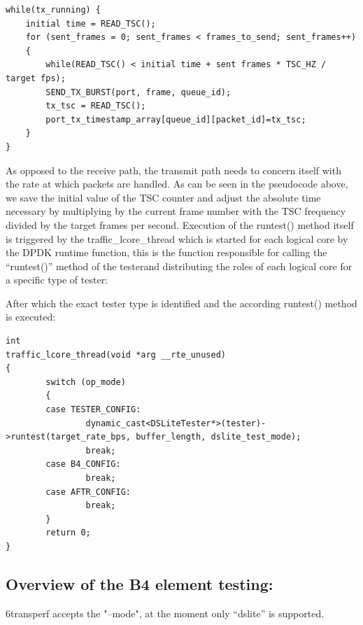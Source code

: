 \documentclass[a4paper,12p,titlepage]{article}
\begin{document}
\begin{frame}

\lstset{language=C++,breaklines=true,numbers=left}
\begin{lstlisting}
while(tx_running) {
	initial time = READ_TSC();
	for (sent_frames = 0; sent_frames < frames_to_send; sent_frames++)
	{
		while(READ_TSC() < initial time + sent frames * TSC_HZ / target fps);
		SEND_TX_BURST(port, frame, queue_id);
		tx_tsc = READ_TSC();
		port_tx_timestamp_array[queue_id][packet_id]=tx_tsc;
	}
}

\end{lstlisting}
\end{frame}

	As opposed to the receive path, the transmit path needs to concern itself with the rate at which packets are handled. As can be seen in the pseudocode above, we save the initial value of the TSC counter and adjust the absolute time necessary by multiplying by the current frame number with the TSC frequency divided by the target frames per second.
	Execution of the runtest() method itself is triggered by the traffic\_lcore\_thread which is started for each logical core by the DPDK runtime function, this is the function responsible for calling the “runtest()” method of the testerand distributing the roles of each logical core for a specific type of tester:
 
After which the exact tester type is identified and the according runtest() method is executed:

\begin{frame}

\lstset{language=C++,breaklines=true,numbers=left}
\begin{lstlisting}
int
traffic_lcore_thread(void *arg __rte_unused)
{
        switch (op_mode)
        {
        case TESTER_CONFIG:
                dynamic_cast<DSLiteTester*>(tester)->runtest(target_rate_bps, buffer_length, dslite_test_mode);
                break;
        case B4_CONFIG:
                break;
        case AFTR_CONFIG:
                break;
        }
        return 0;
}
\end{lstlisting}
\end{frame}

\subsection{Overview of the B4 element testing:}

6transperf accepts the "--mode", at the moment only “dslite” is supported.
\end{document}
